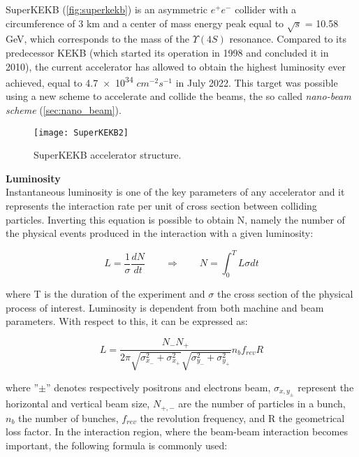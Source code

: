 SuperKEKB\cite{Ohnishi:2013fma} (\autoref{fig:superkekb}) is an asymmetric $e^{+}e^{-}$ collider with a circumference of 3 km and a center of mass energy peak equal to  $\sqrt{s}$ = 10.58 GeV, which corresponds to the mass of the $\Upsilon(4S)$ resonance.
Compared to its predecessor KEKB (which started its operation in 1998 and concluded it in 2010), the current accelerator has allowed to obtain the highest luminosity ever achieved, equal to \num{4.7e34} $cm^{-2}s^{-1}$ in July 2022. This target was possible using a new scheme to accelerate and collide the beams, the so called \textit{nano-beam scheme} (\autoref{sec:nano_beam}). 


\begin{figure}[h!]
\centering
\texttt{[image: SuperKEKB2]}
\caption{SuperKEKB accelerator structure.}
\label{fig:superkekb}
\end{figure}


\bigskip

\textbf{Luminosity}\\

Instantaneous luminosity is one of the key parameters of any accelerator and it represents the interaction rate per unit of cross section between colliding particles. Inverting this equation is possible to obtain N, namely the number of the physical events produced in the interaction with a given luminosity:

\begin{equation}
L =\frac{1}{\sigma}\frac{dN}{dt}  \qquad   \Rightarrow \qquad  N = \int_{0}^{T} L\sigma dt
\end{equation}

where T is the duration of the experiment and $\sigma$ the cross section of the physical process of interest. Luminosity is dependent from both machine and beam parameters. With respect to this, it can be expressed as:

\begin{equation}
L = \frac{N_{-} N_{+}}{2\pi\sqrt{\sigma_{x_{-}}^{2} + \sigma_{x_{+}}^{2}} \sqrt{\sigma_{y_{-}}^{2} + \sigma_{y_{+}}^{2}}} n_{b}f_{rev}R
\end{equation}

where ''$\pm$'' denotes respectively positrons and electrons beam, $\sigma_{x,y_{\pm}}$ represent the horizontal and vertical beam size, $N_{+,-}$  are the number of particles in a bunch, $n_{b}$ the number of bunches, $f_{rev}$ the revolution frequency, and R the geometrical loss factor. In the interaction region, where the beam-beam interaction becomes important, the following formula is commonly used:

